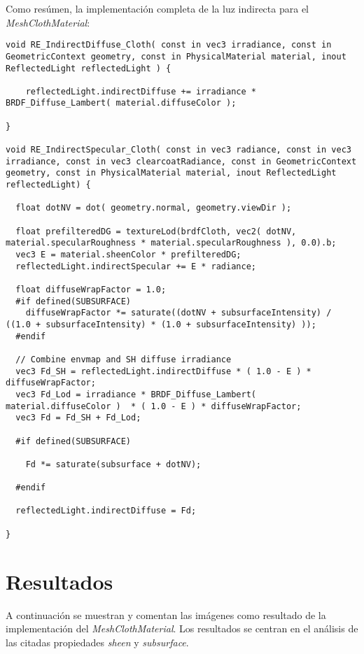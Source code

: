 Como res\'umen, la implementaci\'on completa de la luz indirecta para el \textit{MeshClothMaterial}:\\

    \begin{lstlisting}[caption=C\'alculo de las componentes difusa y especular en \textit{MeshClothMaterial}]
void RE_IndirectDiffuse_Cloth( const in vec3 irradiance, const in GeometricContext geometry, const in PhysicalMaterial material, inout ReflectedLight reflectedLight ) {

    reflectedLight.indirectDiffuse += irradiance * BRDF_Diffuse_Lambert( material.diffuseColor );

}

void RE_IndirectSpecular_Cloth( const in vec3 radiance, const in vec3 irradiance, const in vec3 clearcoatRadiance, const in GeometricContext geometry, const in PhysicalMaterial material, inout ReflectedLight reflectedLight) {

  float dotNV = dot( geometry.normal, geometry.viewDir );

  float prefilteredDG = textureLod(brdfCloth, vec2( dotNV, material.specularRoughness * material.specularRoughness ), 0.0).b;
  vec3 E = material.sheenColor * prefilteredDG;
  reflectedLight.indirectSpecular += E * radiance;

  float diffuseWrapFactor = 1.0;
  #if defined(SUBSURFACE)
    diffuseWrapFactor *= saturate((dotNV + subsurfaceIntensity) / ((1.0 + subsurfaceIntensity) * (1.0 + subsurfaceIntensity) ));
  #endif

  // Combine envmap and SH diffuse irradiance
  vec3 Fd_SH = reflectedLight.indirectDiffuse * ( 1.0 - E ) * diffuseWrapFactor;
  vec3 Fd_Lod = irradiance * BRDF_Diffuse_Lambert( material.diffuseColor )  * ( 1.0 - E ) * diffuseWrapFactor;
  vec3 Fd = Fd_SH + Fd_Lod;

  #if defined(SUBSURFACE)

    Fd *= saturate(subsurface + dotNV);

  #endif

  reflectedLight.indirectDiffuse = Fd;

}
    \end{lstlisting}
    \singlespacing

\section{Resultados}

A continuaci\'on se muestran y comentan las im\'agenes como resultado de la implementaci\'on del \textit{MeshClothMaterial}. Los resultados se centran
en el an\'alisis de las citadas propiedades \textit{sheen} y \textit{subsurface}.

